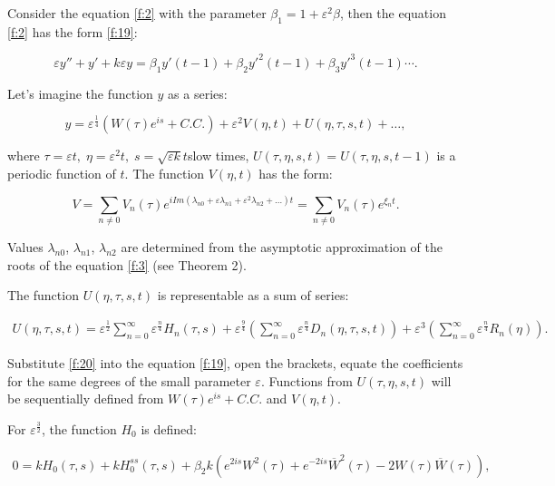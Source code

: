 \documentclass[12pt]{article} %
\newcommand{\eps}{\varepsilon}
\begin{document}
Consider the equation \eqref{f:2} with the parameter $\beta_1=1+\eps^2\beta$, then the equation \eqref{f:2} has the form \eqref{f:19}:

\begin{equation}
\eps y''+y'+k\eps y=\beta_1y'(t-1)+\beta_2y'^2(t-1)+\beta_3y'^3(t-1)\cdots.
\label{f:19}
\end{equation}

Let's imagine the function \(y\) as a series:

\begin{equation}
y=\eps^{\frac{1}{4}}(W(\tau)e^{is}+C.C.)+\eps^2 V(\eta,t)+U(\eta,\tau,s,t)+\ldots,
\label{f:20}
\end{equation}

\noindent where $\tau=\eps t,\;\eta=\eps^2t,\;s=\sqrt{\eps k}t$slow times, $U(\tau,\eta,s,t)=U(\tau,\eta,s,t-1)$ is a periodic function of $t$. The function $V(\eta,t)$ has the form:

\begin{equation*}
V=\sum_{n\neq0}V_n(\tau)e^{iIm(\lambda_{n0}+ \varepsilon\lambda_{n1}+\varepsilon^{2}\lambda_{n2}+\ldots)t}=\sum_{n\neq0}V_n(\tau)e^{\xi_nt}.
\end{equation*}

\noindent Values \(\lambda_{n0}\), \(\lambda_{n1}\), \(\lambda_{n2}\) are determined from the asymptotic approximation of the roots of the equation \eqref{f:3} (see Theorem 2).

The function $U(\eta,\tau,s,t)$ is representable as a sum of series:

\begin{equation*} 
\begin{array}{cc}
U(\eta,\tau,s,t)=\eps^{\frac{1}{2}}\sum\limits_{n=0}^\infty \eps^{\frac{n}{4}}H_n(\tau,s)
+\eps^{\frac{9}{4}}(\sum\limits_{n=0}^\infty \eps^{\frac{n}{4}}D_n(\eta,\tau,s,t)) +\eps^{3}(\sum\limits_{n=0}^\infty \eps^{\frac{n}{4}}R_n(\eta)).
\end{array}
\end{equation*}

Substitute \eqref{f:20} into the equation \eqref{f:19}, open the brackets, equate the coefficients for the same degrees of the small parameter \(\eps\). Functions from $U(\tau,\eta,s,t)$ will be sequentially defined from $W(\tau)e^{is}+C.C.$ and $V(\eta,t)$.

For $\eps^{\frac{3}{2}}$, the function $H_0$ is defined:

\begin{equation*}
\begin{array}{c}
0=kH_0(\tau,s)+kH_0^{ss}(\tau,s)+
\beta_2k(e^{2is}W^2(\tau)+e^{-2is}\overline{W}^2(\tau)-2W(\tau)\overline{W}(\tau)),
\end{array}
\end{equation*}
\end{document}
